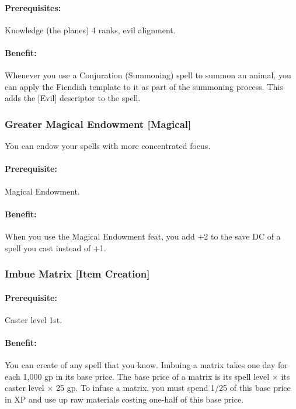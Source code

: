 \paragraph{Prerequisites:} Knowledge (the planes) 4 ranks, evil alignment.

\paragraph{Benefit:} Whenever you use a Conjuration (Summoning) spell to summon an animal, you can apply the Fiendish template to it as part of the summoning process. This adds the [Evil] descriptor to the spell.
\subsubsection[Greater Magical Endowment]{Greater Magical Endowment [Magical]}
\label{Feat:GreaterMagicalEndowment}
You can endow your spells with more concentrated focus.

\paragraph{Prerequisite:} Magical Endowment.

\paragraph{Benefit:} When you use the Magical Endowment feat, you add +2 to the save DC of a spell you cast instead of +1.
\subsubsection[Imbue Matrix]{Imbue Matrix [Item Creation]}
\label{Feat:ImbueMatrix}
\paragraph{Prerequisite:}
Caster level 1st.

\paragraph{Benefit:}
You can create  of any spell that you know. 
Imbuing a matrix takes one day for each 1,000 gp in its base price. 
The base price of a matrix is its spell level $\times$ its caster level $\times$ 25 gp.%
To infuse a matrix, you must spend 1/25 of this base price in XP and use up raw materials costing one-half of this base price.

